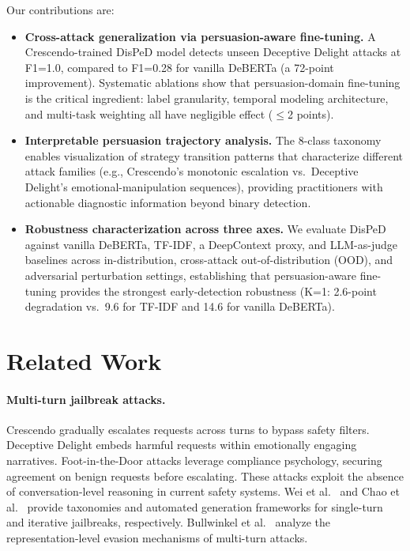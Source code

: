 \documentclass[11pt,a4paper]{article}
\newcommand{\ours}{DisPeD}
\begin{document}
Our contributions are:
\begin{itemize}
\item \textbf{Cross-attack generalization via persuasion-aware fine-tuning.} A Crescendo-trained \ours{} model detects unseen Deceptive Delight attacks at F1=1.0, compared to F1=0.28 for vanilla DeBERTa (a 72-point improvement). Systematic ablations show that persuasion-domain fine-tuning is the critical ingredient: label granularity, temporal modeling architecture, and multi-task weighting all have negligible effect ($\leq$2 points).
\item \textbf{Interpretable persuasion trajectory analysis.} The 8-class taxonomy enables visualization of strategy transition patterns that characterize different attack families (e.g., Crescendo's monotonic escalation vs.\ Deceptive Delight's emotional-manipulation sequences), providing practitioners with actionable diagnostic information beyond binary detection.
\item \textbf{Robustness characterization across three axes.} We evaluate \ours{} against vanilla DeBERTa, TF-IDF, a DeepContext proxy, and LLM-as-judge baselines across in-distribution, cross-attack out-of-distribution (OOD), and adversarial perturbation settings, establishing that persuasion-aware fine-tuning provides the strongest early-detection robustness (K=1: 2.6-point degradation vs.\ 9.6 for TF-IDF and 14.6 for vanilla DeBERTa).
\end{itemize}

\section{Related Work}

\paragraph{Multi-turn jailbreak attacks.}
Crescendo \cite{russinovich2024} gradually escalates requests across turns to bypass safety filters. Deceptive Delight \cite{decdelight2024} embeds harmful requests within emotionally engaging narratives. Foot-in-the-Door attacks leverage compliance psychology, securing agreement on benign requests before escalating. These attacks exploit the absence of conversation-level reasoning in current safety systems. Wei et al.~\cite{wei2024jailbroken} and Chao et al.~\cite{chao2023pair} provide taxonomies and automated generation frameworks for single-turn and iterative jailbreaks, respectively. Bullwinkel et al.~\cite{bullwinkel2025} analyze the representation-level evasion mechanisms of multi-turn attacks.
\end{document}
